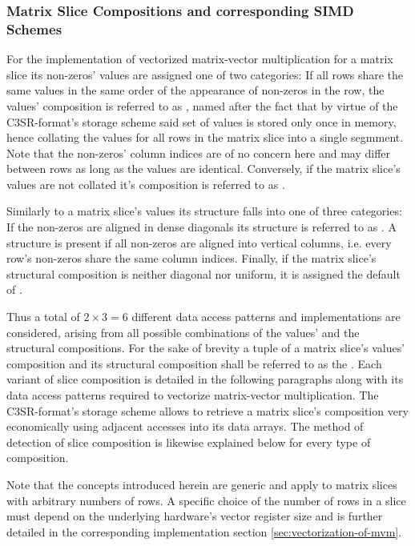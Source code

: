       \subsubsection{Matrix Slice Compositions and corresponding SIMD Schemes}

        For the implementation of vectorized matrix-vector multiplication for a matrix slice its non-zeros' values are
        assigned one of two categories: If all rows share the same values in the same order of the appearance of
        non-zeros in the row, the values' composition is referred to as , named after the fact that by
        virtue of the C3SR-format's storage scheme said set of values is stored only once in memory, hence collating the
        values for all rows in the matrix slice into a single segmment. Note that the non-zeros' column indices are of
        no concern here and may differ between rows as long as the values are identical. Conversely, if the matrix
        slice's values are not collated it's composition is referred to as .

        Similarly to a matrix slice's values its structure falls into one of three categories: If the non-zeros are
        aligned in dense diagonals its structure is referred to as . A  structure is
        present if all non-zeros are aligned into vertical columns, i.e. every row's non-zeros share the same column
        indices. Finally, if the matrix slice's structural composition is neither diagonal nor uniform, it is assigned
        the default of .

        Thus a total of $2 \times 3 = 6$ different data access patterns and implementations are considered, arising from
        all possible combinations of the values' and the structural compositions. For the sake of brevity a tuple of a
        matrix slice's values' composition and its structural composition shall be referred to as the . Each variant of slice composition is detailed in the following paragraphs along with its data
        access patterns required to vectorize matrix-vector multiplication. The C3SR-format's storage scheme allows to
        retrieve a matrix slice's composition very economically using adjacent accesses into its data arrays. The method
        of detection of slice composition is likewise explained below for every type of composition.

        Note that the concepts introduced herein are generic and apply to matrix slices with arbitrary numbers of rows.
        A specific choice of the number of rows in a slice must depend on the underlying hardware's vector register size
        and is further detailed in the corresponding implementation section \ref{sec:vectorization-of-mvm}.

